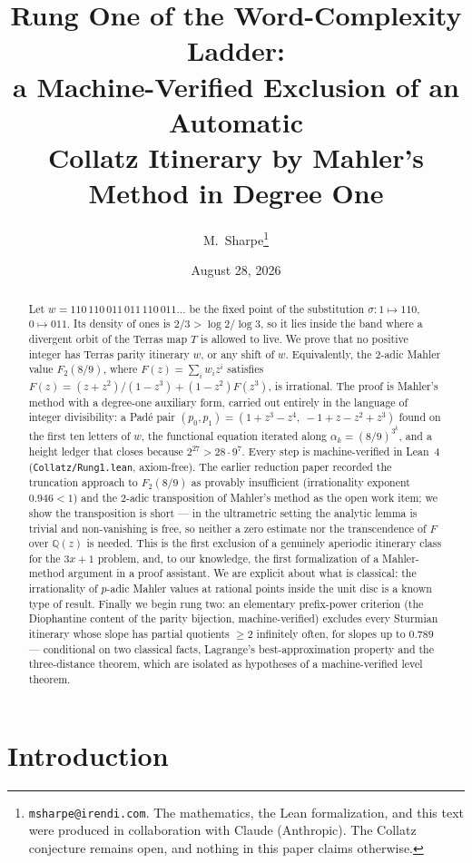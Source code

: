 \documentclass[11pt]{article}
\title{Rung One of the Word-Complexity Ladder:\\
  a Machine-Verified Exclusion of an Automatic\\
  Collatz Itinerary by Mahler's Method in Degree One}
\author{M.~Sharpe\thanks{\texttt{msharpe@irendi.com}. The mathematics,
  the Lean formalization, and this text were produced in collaboration
  with Claude (Anthropic). The Collatz conjecture remains open, and
  nothing in this paper claims otherwise.}}
\date{August 28, 2026}
\theoremstyle{definition}
\newcommand{\Q}{\mathbb{Q}}
\newcommand{\code}[1]{\texttt{#1}}
\begin{document}
\maketitle

\begin{abstract}
Let $w = 110\,110\,011\,011\,110\,011\ldots$ be the fixed point of the
substitution $\sigma\colon 1 \mapsto 110$, $0 \mapsto 011$. Its density
of ones is $2/3 > \log 2/\log 3$, so it lies inside the band where a
divergent orbit of the Terras map $T$ is allowed to live. We prove
that no positive integer has Terras parity itinerary $w$, or any shift
of $w$. Equivalently, the $2$-adic Mahler value $F_2(8/9)$, where
$F(z) = \sum_i w_i z^i$ satisfies
$F(z) = (z+z^2)/(1-z^3) + (1-z^2)F(z^3)$, is irrational. The proof is
Mahler's method with a degree-one auxiliary form, carried out entirely
in the language of integer divisibility: a Pad\'e pair
$(p_0, p_1) = (1+z^3-z^4,\ -1+z-z^2+z^3)$ found on the first ten
letters of $w$, the functional equation iterated along
$\alpha_k = (8/9)^{3^k}$, and a height ledger that closes because
$2^{27} > 28\cdot 9^7$. Every step is machine-verified in Lean~4
(\code{Collatz/Rung1.lean}, axiom-free). The earlier reduction paper
recorded the truncation approach to $F_2(8/9)$ as provably
insufficient (irrationality exponent $0.946 < 1$) and the $2$-adic
transposition of Mahler's method as the open work item; we show the
transposition is short --- in the ultrametric setting the analytic
lemma is trivial and non-vanishing is free, so neither a zero estimate
nor the transcendence of $F$ over $\Q(z)$ is needed. This is the first
exclusion of a genuinely aperiodic itinerary class for the $3x+1$
problem, and, to our knowledge, the first formalization of a
Mahler-method argument in a proof assistant. We are explicit about
what is classical: the irrationality of $p$-adic Mahler values at
rational points inside the unit disc is a known type of result.
Finally we begin rung two: an elementary prefix-power criterion
(the Diophantine content of the parity bijection, machine-verified)
excludes every Sturmian itinerary whose slope has partial quotients
$\ge 2$ infinitely often, for slopes up to $0.789$ --- conditional on
two classical facts, Lagrange's best-approximation property and the
three-distance theorem, which are isolated as hypotheses of a
machine-verified level theorem.
\end{abstract}

\section{Introduction}
\end{document}
